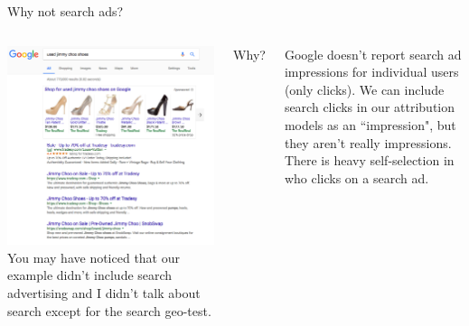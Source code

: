 \documentclass[10pt, aspectratio=169]{beamer}
\begin{document}
\begin{frame}{Why not search ads?}
\begin{columns}
\includegraphics[width=\textwidth]{images/searchad.png}
You may have noticed that our example didn't include search advertising and I didn't talk about search except for the search geo-test.\\
\bigskip \pause
\begin{center} \alert{Why?} \end{center}
\bigskip \pause
Google doesn't report search ad impressions for individual users (only clicks).  We can include search clicks in our attribution models as an ``impression", but they aren't really impressions. There is heavy self-selection in who clicks on a search ad. 
\end{columns}
\end{frame}
\end{document}
